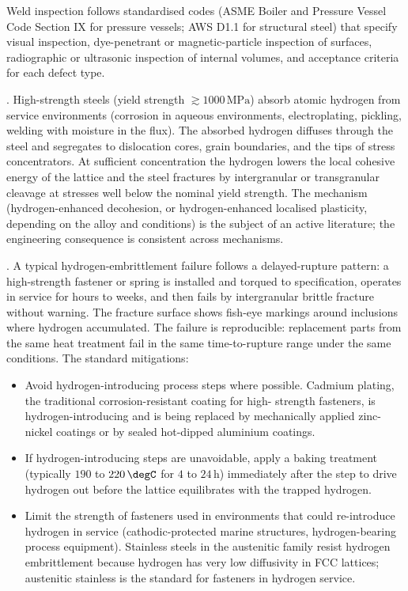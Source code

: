 Weld inspection follows standardised codes (ASME Boiler and Pressure
Vessel Code Section IX for pressure vessels; AWS D1.1 for structural
steel) that specify visual inspection, dye-penetrant or
magnetic-particle inspection of surfaces, radiographic or
ultrasonic inspection of internal volumes, and acceptance criteria
for each defect type.

. High-strength steels (yield
strength $\gtrsim 1000\,\text{MPa}$) absorb atomic hydrogen from
service environments (corrosion in aqueous environments,
electroplating, pickling, welding with moisture in the flux). The
absorbed hydrogen diffuses through the steel and segregates to
dislocation cores, grain boundaries, and the tips of stress
concentrators. At sufficient concentration the hydrogen lowers the
local cohesive energy of the lattice and the steel fractures by
intergranular or transgranular cleavage at stresses well below the
nominal yield strength. The mechanism (hydrogen-enhanced decohesion,
or hydrogen-enhanced localised plasticity, depending on the alloy
and conditions) is the subject of an active literature; the
engineering consequence is consistent across mechanisms.

. A typical hydrogen-embrittlement failure
follows a delayed-rupture pattern: a high-strength fastener or
spring is installed and torqued to specification, operates in
service for hours to weeks, and then fails by intergranular brittle
fracture without warning. The fracture surface shows fish-eye
markings around inclusions where hydrogen accumulated. The failure
is reproducible: replacement parts from the same heat treatment
fail in the same time-to-rupture range under the same conditions.
The standard mitigations:

\begin{itemize}[leftmargin=*]
\item Avoid hydrogen-introducing process steps where possible. Cadmium
  plating, the traditional corrosion-resistant coating for high-
  strength fasteners, is hydrogen-introducing and is being replaced
  by mechanically applied zinc-nickel coatings or by sealed
  hot-dipped aluminium coatings.
\item If hydrogen-introducing steps are unavoidable, apply a baking
  treatment (typically $190$ to $220\,\degC$ for $4$ to $24\,
  \text{h}$) immediately after the step to drive hydrogen out
  before the lattice equilibrates with the trapped hydrogen.
\item Limit the strength of fasteners used in environments that
  could re-introduce hydrogen in service (cathodic-protected marine
  structures, hydrogen-bearing process equipment). Stainless steels
  in the austenitic family resist hydrogen embrittlement because
  hydrogen has very low diffusivity in FCC lattices; austenitic
  stainless is the standard for fasteners in hydrogen service.
\end{itemize}


